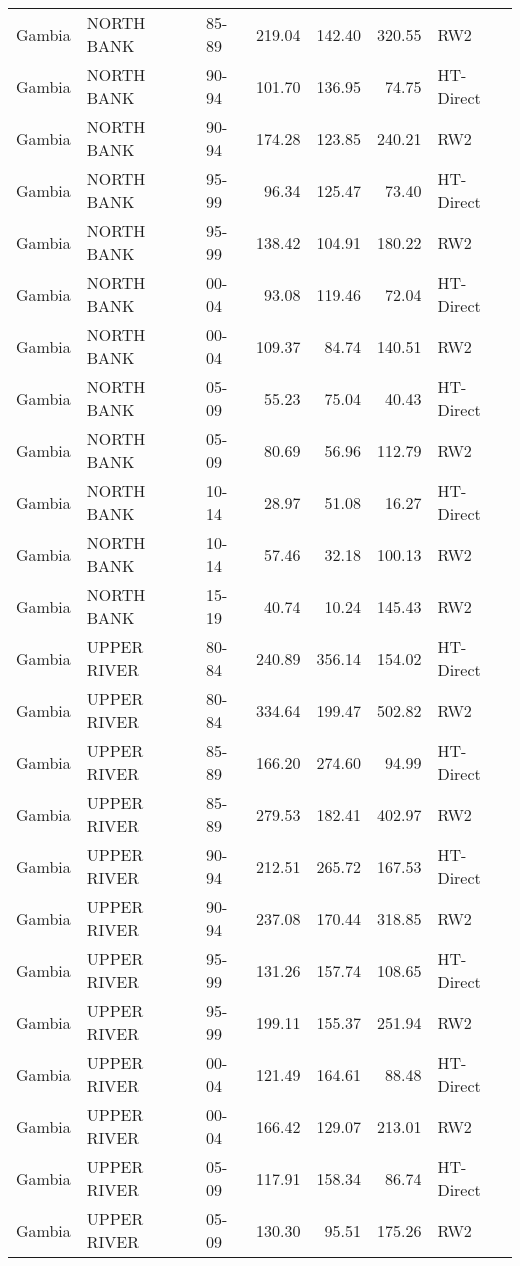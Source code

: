 \begin{longtable}{lllrrrl}
  Gambia & NORTH BANK & 85-89 & 219.04 & 142.40 & 320.55 & RW2 \\ 
  Gambia & NORTH BANK & 90-94 & 101.70 & 136.95 & 74.75 & HT-Direct \\ 
  Gambia & NORTH BANK & 90-94 & 174.28 & 123.85 & 240.21 & RW2 \\ 
  Gambia & NORTH BANK & 95-99 & 96.34 & 125.47 & 73.40 & HT-Direct \\ 
  Gambia & NORTH BANK & 95-99 & 138.42 & 104.91 & 180.22 & RW2 \\ 
  Gambia & NORTH BANK & 00-04 & 93.08 & 119.46 & 72.04 & HT-Direct \\ 
  Gambia & NORTH BANK & 00-04 & 109.37 & 84.74 & 140.51 & RW2 \\ 
  Gambia & NORTH BANK & 05-09 & 55.23 & 75.04 & 40.43 & HT-Direct \\ 
  Gambia & NORTH BANK & 05-09 & 80.69 & 56.96 & 112.79 & RW2 \\ 
  Gambia & NORTH BANK & 10-14 & 28.97 & 51.08 & 16.27 & HT-Direct \\ 
  Gambia & NORTH BANK & 10-14 & 57.46 & 32.18 & 100.13 & RW2 \\ 
  Gambia & NORTH BANK & 15-19 & 40.74 & 10.24 & 145.43 & RW2 \\ 
  Gambia & UPPER RIVER & 80-84 & 240.89 & 356.14 & 154.02 & HT-Direct \\ 
  Gambia & UPPER RIVER & 80-84 & 334.64 & 199.47 & 502.82 & RW2 \\ 
  Gambia & UPPER RIVER & 85-89 & 166.20 & 274.60 & 94.99 & HT-Direct \\ 
  Gambia & UPPER RIVER & 85-89 & 279.53 & 182.41 & 402.97 & RW2 \\ 
  Gambia & UPPER RIVER & 90-94 & 212.51 & 265.72 & 167.53 & HT-Direct \\ 
  Gambia & UPPER RIVER & 90-94 & 237.08 & 170.44 & 318.85 & RW2 \\ 
  Gambia & UPPER RIVER & 95-99 & 131.26 & 157.74 & 108.65 & HT-Direct \\ 
  Gambia & UPPER RIVER & 95-99 & 199.11 & 155.37 & 251.94 & RW2 \\ 
  Gambia & UPPER RIVER & 00-04 & 121.49 & 164.61 & 88.48 & HT-Direct \\ 
  Gambia & UPPER RIVER & 00-04 & 166.42 & 129.07 & 213.01 & RW2 \\ 
  Gambia & UPPER RIVER & 05-09 & 117.91 & 158.34 & 86.74 & HT-Direct \\ 
  Gambia & UPPER RIVER & 05-09 & 130.30 & 95.51 & 175.26 & RW2 \\ 

\end{longtable}
